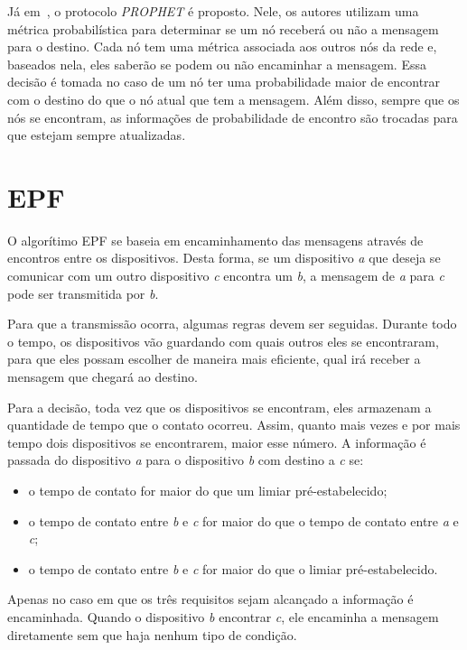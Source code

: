 \documentclass[11pt,a4paper,titlepage]{article}
\begin{document}
Já em~\cite{Lindgren}, o protocolo \textit{PROPHET} é proposto.
Nele, os autores utilizam uma métrica probabilística para determinar se um nó receberá ou não a mensagem para o destino.
Cada nó tem uma métrica associada aos outros nós da rede e, baseados nela, eles saberão se podem ou não encaminhar a mensagem.
Essa decisão é tomada no caso de um nó ter uma probabilidade maior de encontrar com o destino do que o nó atual que tem a mensagem.
Além disso, sempre que os nós se encontram, as informações 
 de probabilidade de encontro são trocadas para que estejam sempre atualizadas.
\section{EPF}
\label{sec:epf}

O algorítimo EPF se baseia em encaminhamento das mensagens através de encontros entre os dispositivos.
Desta forma, se um dispositivo \textit{a} que deseja se comunicar com um outro dispositivo \textit{c} encontra um \textit{b}, a mensagem de \textit{a} para \textit{c} pode ser transmitida por \textit{b}.

Para que a transmissão ocorra, algumas regras devem ser seguidas.
Durante todo o tempo, os dispositivos vão guardando com quais outros eles se encontraram, para que eles possam escolher de maneira mais eficiente, qual irá receber a mensagem que chegará ao destino.

Para a decisão, toda vez que os dispositivos se encontram, eles armazenam a quantidade de tempo que o contato ocorreu.
Assim, quanto mais vezes e por mais tempo dois dispositivos se encontrarem, maior esse número.
A informação é passada do dispositivo \textit{a} para o dispositivo \textit{b} com destino a \textit{c} se:
\begin{itemize}
\item o tempo de contato for maior do que um limiar pré-estabelecido;
\item o tempo de contato entre \textit{b} e \textit{c} for maior do que o tempo de contato entre \textit{a} e \textit{c};
\item o tempo de contato entre \textit{b} e \textit{c} for maior do que o limiar pré-estabelecido.
\end{itemize}

Apenas no caso em que os três requisitos sejam alcançado a informação é encaminhada.
Quando o dispositivo \textit{b} encontrar \textit{c}, ele encaminha a mensagem diretamente sem que haja nenhum tipo de condição.
\end{document}
